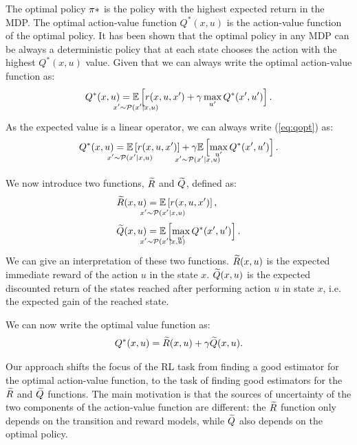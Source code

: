 \documentclass[conference]{IEEEtran}
\begin{document}
The optimal policy $\pi*$ is the policy with the highest expected return in the MDP. The optimal action-value function $Q^*(x, u)$ is the action-value function of the optimal policy.
It has been shown that the optimal policy in any MDP can be always a deterministic policy that at each state chooses the action with the highest $Q^*(x, u)$ value.
Given that we can always write the optimal action-value function as:
\begin{align}
 Q^*(x,u)=\underset{\strut\mathclap{x'\sim \Pmodel(x'|x,u)}}{\mathbb{E}}\left[ r(x,u,x')+\gamma\max_{u'} Q^*(x',u')\right].
 \label{eq:qopt}
\end{align}
As the expected value is a linear operator, we can always write (\ref{eq:qopt}) as:
\begin{align}
 Q^*(x,u)=\underset{\strut\mathclap{x'\sim \Pmodel(x'|x,u)}}{\mathbb{E}}\left[ r(x,u,x')\right]+\underset{\strut\mathclap{x'\sim \Pmodel(x'|x,u)}}{\gamma\mathbb{E}}\left[ \max_{u'} Q^*(x',u')\right].
 \label{eq:qdec}
\end{align}

We now introduce two functions, $\widetilde{R}$ and $\widetilde{Q}$, defined as:
\begin{align}
 \Rtilde(x,u)&=\underset{\strut\mathclap{x'\sim \Pmodel(x'|x,u)}}{\mathbb{E}}\left[ r(x,u,x')\right], \nonumber\ \\
 \Qtilde(x,u)&=\underset{\strut\mathclap{x'\sim \Pmodel(x'|x,u)}}{\mathbb{E}}\left[\max_{u'} Q^*(x',u')\right].
 \label{eq:rqtilde}
\end{align}
We can give an interpretation of these two functions. $\widetilde{R}(x,u)$ is the expected immediate reward of the action $u$ in the state $x$. $\widetilde{Q}(x,u)$ is the expected discounted return of the states reached after performing action $u$ in state $x$, i.e. the expected gain of the reached state.

We can now write the optimal value function as:
\begin{align}
 Q^*(x,u)=\Rtilde(x,u)+\gamma\Qtilde(x,u).
 \label{eq:qdecrqtilde}
\end{align}

Our approach shifts the focus of the RL task from finding a good estimator for the optimal action-value function, to the task of finding good estimators for the $\widetilde{R}$ and $\widetilde{Q}$ functions. The main motivation is that the sources of uncertainty of the two components of the action-value function are different: the $\widetilde{R}$ function only depends on the transition and reward models, while $\widetilde{Q}$ also depends on the optimal policy.
\end{document}

